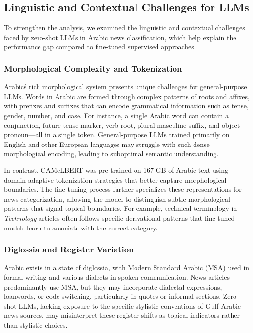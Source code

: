 \documentclass[preprint,12pt,authoryear]{elsarticle}
\begin{document}
\subsection{Linguistic and Contextual Challenges for LLMs}

To strengthen the analysis, we examined the linguistic and contextual challenges faced by zero-shot LLMs in Arabic news classification, which help explain the performance gap compared to fine-tuned supervised approaches.

\subsubsection{Morphological Complexity and Tokenization}

Arabic\'s rich morphological system presents unique challenges for general-purpose LLMs. Words in Arabic are formed through complex patterns of roots and affixes, with prefixes and suffixes that can encode grammatical information such as tense, gender, number, and case. For instance, a single Arabic word can contain a conjunction, future tense marker, verb root, plural masculine suffix, and object pronoun---all in a single token. General-purpose LLMs trained primarily on English and other European languages may struggle with such dense morphological encoding, leading to suboptimal semantic understanding.

In contrast, CAMeLBERT was pre-trained on 167 GB of Arabic text using domain-adaptive tokenization strategies that better capture morphological boundaries. The fine-tuning process further specializes these representations for news categorization, allowing the model to distinguish subtle morphological patterns that signal topical boundaries. For example, technical terminology in \textit{Technology} articles often follows specific derivational patterns that fine-tuned models learn to associate with the correct category.

\subsubsection{Diglossia and Register Variation}

Arabic exists in a state of diglossia, with Modern Standard Arabic (MSA) used in formal writing and various dialects in spoken communication. News articles predominantly use MSA, but they may incorporate dialectal expressions, loanwords, or code-switching, particularly in quotes or informal sections. Zero-shot LLMs, lacking exposure to the specific stylistic conventions of Gulf Arabic news sources, may misinterpret these register shifts as topical indicators rather than stylistic choices.
\end{document}
